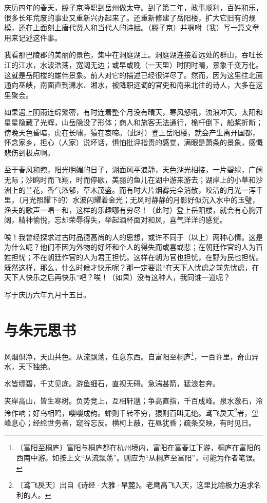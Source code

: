 \documentclass[12pt,UTF-8,openany]{ctexbook}
\begin{document}
\begin{normalsize}
    
    庆历四年的春天，滕子京降职到岳州做太守。到了第二年，政事顺利，百姓和乐，很多长年荒废的事业又重新兴办起来了。还重新修建了岳阳楼，扩大它旧有的规模，还在上面刻上唐代贤人和当代人的诗赋。（滕子京）并嘱咐（我）写一篇文章用来记述这件事。
    
    我看那巴陵郡的美丽的景色，集中在洞庭湖上。洞庭湖连接着远处的群山，吞吐长江的江水，水波浩荡，宽阔无边；或早或晚（一天里）时阴时晴，景象千变万化。这就是岳阳楼的雄伟景象。前人对它的描述已经很详尽了。然而，因为这里往北面通向巫峡，南面直到潇水、湘水，被降职远调的官吏和南来北往的诗人，大多在这里聚会。
    
    如果遇上阴雨连绵繁密，有时连着整个月没有晴天，寒风怒吼，浊浪冲天，太阳和星星隐藏了光辉，山岳隐没了形体；商人和旅客无法通行，桅杆倒下，船桨折断；傍晚天色昏暗，虎在长啸，猿在哀啼。（此时）登上岳阳楼，就会产生离开国都，怀念家乡，担心（人家）说坏话，惧怕批评指责的感觉，满眼是萧条的景象，感慨悲伤到极点啊。
    
    至于春风和煦，阳光明媚的日子，湖面风平浪静，天色湖光相接，一片碧绿，广阔无际；沙鸥时而飞翔，时而停歇，美丽的鱼儿在湖中游来游去；湖岸上的小草和沙洲上的兰花，香气浓郁，草木茂盛。而有时大片烟雾完全消散，皎洁的月光一泻千里，（月光照耀下的）水波闪耀着金光；无风时静静的月影好似沉入水中的玉璧，渔夫的歌声一唱一和，这样的乐趣哪有穷尽！（此时）登上岳阳楼，就会有心胸开阔，精神愉悦，忘却荣辱得失，举起酒杯面对和风，喜气洋洋的感觉。
    
    唉！我曾经探求过古时品德高尚的人的思想，或许不同于（以上）两种心情。这是为什么呢？他们不因为外物的好坏和个人的得失而或喜或悲；在朝廷作官的人为百姓担忧；不在朝廷作官的人为君王担忧。这样在朝为官也担忧，在野为民也担忧。既然这样，那么，什么时候才快乐呢？那一定要说“在天下人忧虑之前先忧虑，在天下人快乐之后再快乐”吧？唉！（如果）没有这种人，我同谁一道呢？
    
    写于庆历六年九月十五日。
    
\end{normalsize}



\chapter{与朱元思书}

\begin{normalsize}
    
    风烟俱净，天山共色。从流飘荡，任意东西。自富阳至桐庐\footnote{〔富阳至桐庐〕富阳与桐庐都在杭州境内，富阳在富春江下游，桐庐在富阳的西南中游。如按上文“从流飘荡”。则应为“从桐庐至富阳”，可能为作者笔误。}，一百许里，奇山异水，天下独绝。
    
    水皆缥碧，千丈见底。游鱼细石，直视无碍。急湍甚箭，猛浪若奔。
    
    夹岸高山，皆生寒树。负势竞上，互相轩邈；争高直指，千百成峰。泉水激石，泠泠作响；好鸟相鸣，嘤嘤成韵。蝉则千转不穷，猿则百叫无绝。鸢飞戾天\footnote{〔鸢飞戾天〕出自《诗经·大雅·旱麓》。老鹰高飞入天，这里比喻极力追求名利的人。}者，望峰息心；经纶世务者，窥谷忘反。横柯上蔽，在昼犹昏；疏条交映，有时见日。
\end{normalsize}
\end{document}
